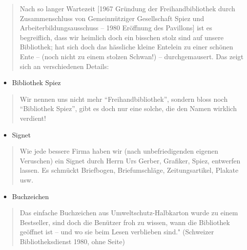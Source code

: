 \documentclass[a4paper,
fontsize=11pt,
oneside,
numbers=noperiodatend,
parskip=half-,
bibliography=totoc,
final
]{scrartcl}
\begin{document}
\begin{quote}
Nach so langer Wartezeit {[}1967 Gründung der Freihandbibliothek durch
Zusammenschluss von Gemeinnütziger Gesellschaft Spiez und
Arbeiterbildungsausschuss -- 1980 Eröffnung des Pavillons{]} ist es
begreiflich, dass wir heimlich doch ein bisschen stolz sind auf unsere
Bibliothek; hat sich doch das hässliche kleine Entelein zu einer schönen
Ente -- (noch nicht zu einem stolzen Schwan!) -- durchgemausert. Das
zeigt sich an verschiedenen Details:
\end{quote}

\begin{itemize}
\itemsep1pt\parskip0pt
\item
  Bibliothek Spiez
\end{itemize}

\begin{quote}
Wir nennen uns nicht mehr \enquote{Freihandbibliothek}, sondern bloss noch
\enquote{Bibliothek Spiez}, gibt es doch nur eine solche, die den Namen wirklich
verdient!
\end{quote}

\begin{itemize}
\itemsep1pt\parskip0pt
\item
  Signet
\end{itemize}

\begin{quote}
Wie jede bessere Firma haben wir (nach unbefriedigenden eigenen
Veruschen) ein Signet durch Herrn Urs Gerber, Grafiker, Spiez, entwerfen
lassen. Es schmückt Briefbogen, Briefumschläge, Zeitungsartikel, Plakate
usw.
\end{quote}

\begin{itemize}
\itemsep1pt\parskip0pt
\item
  Buchzeichen
\end{itemize}

\begin{quote}
Das einfache Buchzeichen aus Umweltschutz-Halbkarton wurde zu einem
Bestseller, sind doch die Benützer froh zu wissen, wann die Bibliothek
geöffnet ist -- und wo sie beim Lesen verblieben sind." (Schweizer
Bibliotheksdienst 1980, ohne Seite)
\end{quote}
\end{document}
